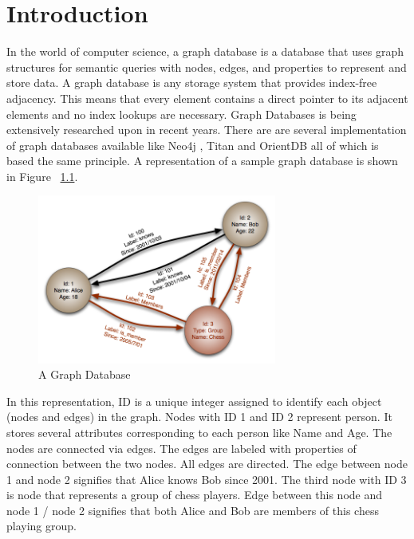 \documentclass[12pt, oneside]{book}
\begin{document}
\chapter{Introduction}
In the world of computer science, a graph database is a database that uses graph structures for semantic queries with nodes, edges, and properties to represent and store data. A graph database is any storage system that provides index-free adjacency. This means that every element contains a direct pointer to its adjacent elements and no index lookups are necessary. Graph Databases is being extensively researched upon in recent years. There are are several implementation of graph databases available like Neo4j \cite{neo4j}, Titan \cite{titan} and OrientDB \cite{orientdb} all of which is based the same principle. A representation of a sample graph database is shown in Figure ~\ref{fig:sample_graph}. \\
\begin{figure}[h]
 \begin{center}
  \includegraphics[width=0.7\textwidth]{pics/graph.png}
  \caption{A Graph Database}
 \label{fig:sample_graph}
 \end{center}
\end{figure}
In this representation, ID is a unique integer assigned to identify each object (nodes and edges) in the graph. Nodes with ID 1 and ID 2 represent person. It stores several attributes corresponding to each person like Name and Age. The nodes are connected via edges. The edges are labeled with properties of connection between the two nodes. All edges are directed. The edge between node 1 and node 2 signifies that Alice knows Bob since 2001. The third node with ID 3 is node that represents a group of chess players. Edge between this node and node 1 / node 2 signifies that both Alice and Bob are members of this chess playing group.
\end{document}
